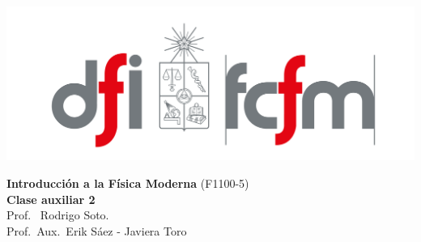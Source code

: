 \documentclass[
  11pt,
  letterpaper,
   addpoints,
   answers
  ]{exam}
\begin{document}
\noindent
\begin{minipage}{0.47\textwidth}
\includegraphics[width=\textwidth]{../fcfm_die.png}
\end{minipage}
\begin{minipage}{0.53\textwidth}
\begin{center} 
\large\textbf{Introducción a la Física Moderna} (F1100-5) \\
\large\textbf{Clase auxiliar 2} \\
\normalsize Prof.~ Rodrigo Soto.\\
\normalsize Prof.~Aux.~Erik Sáez - Javiera Toro 
\end{center}
\end{minipage}

\vspace{0.5cm}
\noindent
\vspace{.85cm}
\end{document}
